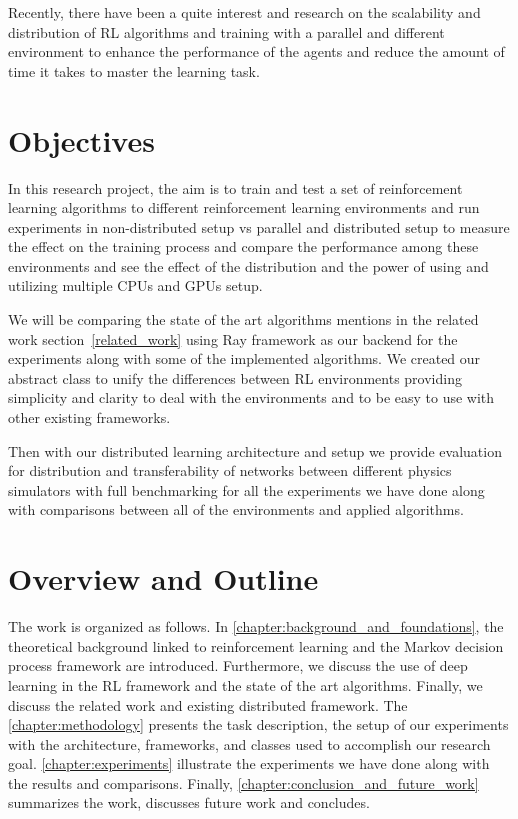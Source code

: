 Recently, there have been a quite interest and research on the scalability and distribution of RL algorithms and training with a parallel and different environment to enhance the performance of the agents and reduce the amount of time it takes to master the learning task.

\section{Objectives}
In this research project, the aim is to train and test a set of reinforcement learning algorithms to different reinforcement learning environments and run experiments in non-distributed setup vs parallel and distributed setup to measure the effect on the training process and compare the performance among these environments and see the effect of the distribution and the power of using and utilizing multiple CPUs and GPUs setup. 

We will be comparing the state of the art algorithms mentions in the related work section~\ref{related_work} using Ray framework as our backend for the experiments along with some of the implemented algorithms. We created our abstract class to unify the differences between RL environments providing simplicity and clarity to deal with the environments and to be easy to use with other existing frameworks.

Then with our distributed learning architecture and setup we provide evaluation for distribution and transferability of networks between different physics simulators with full benchmarking for all the experiments we have done along with comparisons between all of the environments and applied algorithms.

\section{Overview and Outline}
The work is organized as follows. In \autoref{chapter:background_and_foundations}, the theoretical background linked to reinforcement learning and the Markov decision process framework are introduced. Furthermore, we discuss the use of deep learning in the RL framework and the state of the art algorithms. Finally, we discuss the related work and existing distributed framework. The \autoref{chapter:methodology} presents the task description, the setup of our experiments with the architecture, frameworks, and classes used to accomplish our research goal. \autoref{chapter:experiments} illustrate the experiments we have done along with the results and comparisons. Finally, \autoref{chapter:conclusion_and_future_work} summarizes the work, discusses future work and concludes.